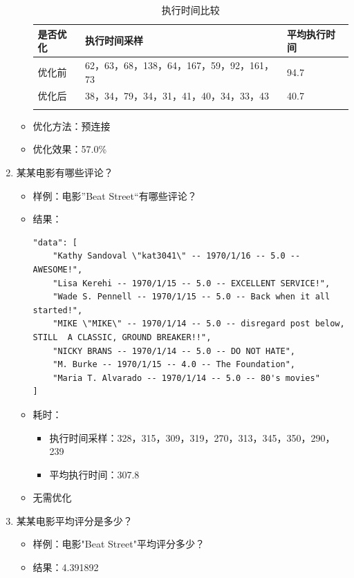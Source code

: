 \documentclass{ctexrep}
\begin{document}
\begin{enumerate}
\begin{itemize}
\begin{longtable}{l|p{5cm}|l}
    	                    是否优化 & 执行时间采样 & 平均执行时间\\
    	                    \hline
    	                    \hline
    	                    优化前 & 62，63，68，138，64，167，59，92，161，73 & 94.7\\
    	                    优化后 & 38，34，79，34，31，41，40，34，33，43 & 40.7\\
    	                    \hline
    	                    \caption{执行时间比较}
    	                \end{longtable}
    	            \item 优化方法：预连接
    	            \item 优化效果：57.0\%
    	        \end{itemize}
	        \item 某某电影有哪些评论？
    	        \begin{itemize}
    	            \item 样例：电影”Beat Street“有哪些评论？
    	            \item 结果：
    	                \begin{lstlisting}
"data": [
    "Kathy Sandoval \"kat3041\" -- 1970/1/16 -- 5.0 -- AWESOME!",
    "Lisa Kerehi -- 1970/1/15 -- 5.0 -- EXCELLENT SERVICE!",
    "Wade S. Pennell -- 1970/1/15 -- 5.0 -- Back when it all started!",
    "MIKE \"MIKE\" -- 1970/1/14 -- 5.0 -- disregard post below, STILL  A CLASSIC, GROUND BREAKER!!",
    "NICKY BRANS -- 1970/1/14 -- 5.0 -- DO NOT HATE",
    "M. Burke -- 1970/1/15 -- 4.0 -- The Foundation",
    "Maria T. Alvarado -- 1970/1/14 -- 5.0 -- 80's movies"
]
    	                \end{lstlisting}
    	            \item 耗时：
    	                \begin{itemize}
    	                    \item 执行时间采样：328，315，309，319，270，313，345，350，290，239
    	                    \item 平均执行时间：307.8
    	                \end{itemize}
    	            \item 无需优化
    	        \end{itemize}
	        \item 某某电影平均评分是多少？
    	        \begin{itemize}
    	            \item 样例：电影"Beat Street"平均评分多少？
    	            \item 结果：4.391892

\end{itemize}
\end{enumerate}
\end{document}
